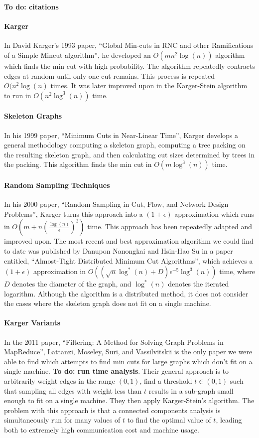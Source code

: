 \documentclass[12pt]{article}
\begin{document}
\textbf{To do: citations}

\paragraph{Karger} In David Karger's 1993 paper, ``Global Min-cuts in RNC and other Ramifications of a Simple Mincut algorithm'', he developed an $O(m n^2 \log(n))$ algorithm which finds the min cut with high probability. The algorithm repeatedly contracts edges at random until only one cut remains. This process is repeated $O(n^2 \log(n)$ times. It was later improved upon in the Karger-Stein algorithm \cite{Karger, David R; Stein, Clifford (1996). ``A new approach to the minimum cut problem''} to run in $O(n^2 \log^3(n))$ time.

\paragraph{Skeleton Graphs} In his 1999 paper, ``Minimum Cuts in Near-Linear Time'', Karger develops a general methodology computing a skeleton graph, computing a tree packing on the resulting skeleton graph, and then calculating cut sizes determined by trees in the packing. This algorithm finds the min cut in $O(m \log^3(n))$ time.

\paragraph{Random Sampling Techniques} In his 2000 paper, ``Random Sampling in Cut, Flow, and Network Design Problems'', Karger turns this approach into a $(1+\epsilon)$ approximation which runs in $O(m + n(\frac{\log(n)}{\epsilon})^3)$ time. This approach has been repeatedly adapted and improved upon. The most recent and best approximation algorithm we could find to date was published by Danupon Nanongkai and Hsin-Hao Su in a paper entitled, ``Almost-Tight Distributed Minimum Cut Algorithms'', which achieves a $(1 + \epsilon)$ approximation in $O((\sqrt{n} \log^*(n) + D) \epsilon^{-5} \log^3(n))$ time, where $D$ denotes the diameter of the graph, and $\log^*(n)$ denotes the iterated logarithm. Although the algorithm is a distributed method, it does not consider the cases where the skeleton graph does not fit on a single machine.

\paragraph*{Karger Variants} In the 2011 paper, ``Filtering: A Method for Solving Graph Problems in MapReduce'', Lattanzi, Moseley, Suri, and Vassilvitskii is the only paper we were able to find which attempts to find min cuts for large graphs which don't fit on a single machine. \textbf{To do: run time analysis}. Their general approach is to arbitrarily weight edges in the range $(0,1)$, find a threshold $t \in (0,1)$ such that sampling all edges with weight less than $t$ results in a sub-graph small enough to fit on a single machine. They then apply Karger-Stein's algorithm. The problem with this approach is that a connected components analysis is simultaneously run for many values of $t$ to find the optimal value of $t$, leading both to extremely high communication cost and machine usage.
\end{document}
